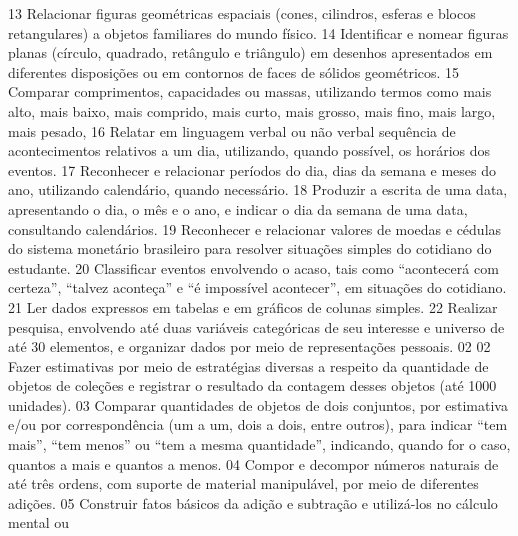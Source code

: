 {{{{{						}
						{13}{%
							Relacionar figuras geométricas espaciais (cones, cilindros, esferas e blocos retangulares) a objetos familiares do mundo físico.
						}
						{14}{%
							Identificar e nomear figuras planas (círculo, quadrado, retângulo e triângulo) em desenhos apresentados em diferentes disposições ou em contornos de faces de sólidos geométricos.
						}
						{15}{%
							Comparar comprimentos, capacidades ou massas, utilizando termos como mais alto, mais baixo, mais comprido, mais curto, mais grosso, mais fino, mais largo, mais pesado,
						}
						{16}{%
							Relatar em linguagem verbal ou não verbal sequência de acontecimentos relativos a um dia, utilizando, quando possível, os horários dos eventos.
						}
						{17}{%
							Reconhecer e relacionar períodos do dia, dias da semana e meses do ano, utilizando calendário, quando necessário.
						}
						{18}{%
							Produzir a escrita de uma data, apresentando o dia, o mês e o ano, e indicar o dia da semana de uma data, consultando calendários.
						}
						{19}{%
							Reconhecer e relacionar valores de moedas e cédulas do sistema monetário brasileiro para resolver situações simples do cotidiano do estudante.
						}
						{20}{%
							Classificar eventos envolvendo o acaso, tais como “acontecerá com certeza”, “talvez aconteça” e “é impossível acontecer”, em situações do cotidiano.
						}
						{21}{%
							Ler dados expressos em tabelas e em gráficos de colunas simples.
						}
						{22}{%
							Realizar pesquisa, envolvendo até duas variáveis categóricas de seu interesse e universo de até 30 elementos, e organizar dados por meio de representações pessoais.
						}
				}
			}
			{02}{%
				{02}{%
					Fazer estimativas por meio de estratégias diversas a respeito da quantidade de
					objetos de coleções e registrar o resultado da contagem desses objetos (até 1000 unidades).
				}
				{03}{%
					Comparar quantidades de objetos de dois conjuntos, por estimativa e/ou por
					correspondência (um a um, dois a dois, entre outros), para indicar “tem mais”, “tem menos” ou
					“tem a mesma quantidade”, indicando, quando for o caso, quantos a mais e quantos a menos.
				}
				{04}{%
					Compor e decompor números naturais de até três ordens, com suporte de
					material manipulável, por meio de diferentes adições.
				}
				{05}{%
					Construir fatos básicos da adição e subtração e utilizá-los no cálculo mental ou
}}}}
